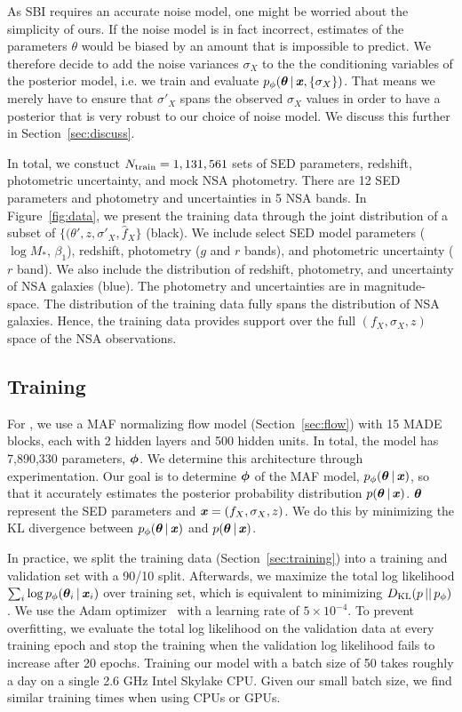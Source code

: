 As SBI requires an accurate noise model, one might be worried about the simplicity of ours.
If the noise model is in fact incorrect, estimates of the parameters $\theta$ would be biased
by an amount that is impossible to predict.
We therefore decide to add the noise variances $\sigma_X$ to the the conditioning variables
of the posterior model, i.e. we train and evaluate $p_\phi(\boldsymbol{\theta}\,|\,\textbf{\textit{x}},\{\sigma_X\})$.
That means we merely have to ensure that $\sigma'_X$ spans the observed $\sigma_X$
values in order to have a posterior that is very robust to our choice of noise model.
We discuss this further in Section~\ref{sec:discuss}.

In total, we constuct $N_{\rm train} = 1,131,561$ sets of SED parameters,
redshift, photometric uncertainty, and mock NSA photometry. 
There are 12 SED parameters and photometry and uncertainties in 5 NSA bands. 
In Figure~\ref{fig:data}, we present the training data through the joint
distribution of a subset of $\{(\theta', z, \sigma'_X, \hat{f}_X \}$ (black).
We include select SED model parameters ($\log M_*$, $\beta_1$), redshift,
photometry ($g$ and $r$ bands), and photometric uncertainty ($r$ band).
We also include the distribution of redshift, photometry, and uncertainty of
NSA galaxies (blue).
The photometry and uncertainties are in magnitude-space. 
The distribution of the training data fully spans the distribution of NSA
galaxies.
Hence, the training data provides support over the full $(f_X, \sigma_X, z)$
space of the NSA observations. 

\subsection{Training \sedflow} \label{sec:anpe_train}
For \sedflow, we use a MAF normalizing flow model (Section~\ref{sec:flow}) with 
15 MADE blocks, each with 2 hidden layers and 500 hidden units.
In total, the model has 7,890,330 parameters, $\boldsymbol{\phi}$. 
We determine this architecture through experimentation. 
Our goal is to determine $\boldsymbol{\phi}$ of the MAF model, 
$p_\phi(\boldsymbol{\theta}\,|\,\textbf{\textit{x}})$, so that it accurately estimates the
posterior probability distribution $p(\boldsymbol{\theta}\,|\,\textbf{\textit{x}})$. 
$\boldsymbol{\theta}$ represent the SED parameters and $\textbf{\textit{x}} = (f_X, \sigma_X, z)$.
We do this by minimizing the KL divergence between 
$p_\phi(\boldsymbol{\theta}\,|\,\textbf{\textit{x}})$ and $p(\boldsymbol{\theta}\,|\,\textbf{\textit{x}})$.

In practice, we split the training data (Section~\ref{sec:training}) into a
training and validation set with a 90/10 split. 
Afterwards, we maximize the total log likelihood $\sum_i \log p_\phi(\boldsymbol{\theta}_i\,|\,
\textbf{\textit{x}}_i)$ over training set, which is equivalent to minimizing 
$D_{\rm KL} (p\,||\,p_\phi)$.
We use the {\sc Adam} optimizer~\citep{kingma2017} with a learning rate of $5\times10^{-4}$. 
To prevent overfitting, we evaluate the total log likelihood on the validation
data at every training epoch and stop the training when the validation log
likelihood fails to increase after 20 epochs.  
Training our model with a batch size of 50 takes roughly a day on a single 2.6
GHz Intel Skylake CPU. 
Given our small batch size, we find similar training times when using CPUs or
GPUs. 
